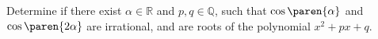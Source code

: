 Determine if there exist $\alpha \in \mathbb{R}$ and $p, q \in \mathbb{Q}$,
such that $\cos\paren{\alpha}$ and $\cos\paren{2 \alpha}$ are irrational,
and are roots of the polynomial $x^2 + p x + q$.
